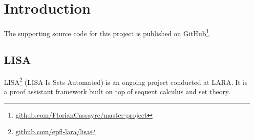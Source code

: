 \section{Introduction}
\label{sec:introduction}


The supporting source code for this project is published on GitHub\footnote{\href{http://github.com/FlorianCassayre/master-project}{github.com/FlorianCassayre/master-project}}.

\cite{Asperti2007}

\subsection{LISA}

LISA\footnote{\href{https://github.com/epfl-lara/lisa}{github.com/epfl-lara/lisa}} (LISA Is Sets Automated) is an ongoing project conducted at LARA. It is a proof assistant framework built on top of sequent calculus and set theory. \cite{Guilloud2022-2}

